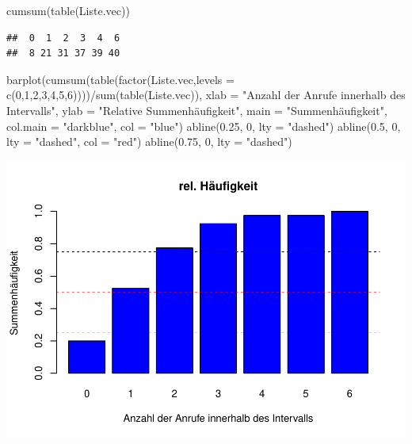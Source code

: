 \documentclass[
]{article}
\newenvironment{Shaded}{\begin{snugshade}}{\end{snugshade}}
\newcommand{\AttributeTok}[1]{\textcolor[rgb]{0.77,0.63,0.00}{#1}}
\newcommand{\DecValTok}[1]{\textcolor[rgb]{0.00,0.00,0.81}{#1}}
\newcommand{\FloatTok}[1]{\textcolor[rgb]{0.00,0.00,0.81}{#1}}
\newcommand{\FunctionTok}[1]{\textcolor[rgb]{0.00,0.00,0.00}{#1}}
\newcommand{\NormalTok}[1]{#1}
\newcommand{\SpecialCharTok}[1]{\textcolor[rgb]{0.00,0.00,0.00}{#1}}
\newcommand{\StringTok}[1]{\textcolor[rgb]{0.31,0.60,0.02}{#1}}
\begin{document}
\begin{Shaded}
\begin{Highlighting}[]
\FunctionTok{cumsum}\NormalTok{(}\FunctionTok{table}\NormalTok{(Liste.vec))}
\end{Highlighting}
\end{Shaded}

\begin{verbatim}
##  0  1  2  3  4  6 
##  8 21 31 37 39 40
\end{verbatim}

\begin{Shaded}
\begin{Highlighting}[]
\FunctionTok{barplot}\NormalTok{(}\FunctionTok{cumsum}\NormalTok{(}\FunctionTok{table}\NormalTok{(}\FunctionTok{factor}\NormalTok{(Liste.vec,}\AttributeTok{levels =} \FunctionTok{c}\NormalTok{(}\DecValTok{0}\NormalTok{,}\DecValTok{1}\NormalTok{,}\DecValTok{2}\NormalTok{,}\DecValTok{3}\NormalTok{,}\DecValTok{4}\NormalTok{,}\DecValTok{5}\NormalTok{,}\DecValTok{6}\NormalTok{))))}\SpecialCharTok{/}\FunctionTok{sum}\NormalTok{(}\FunctionTok{table}\NormalTok{(Liste.vec)), }\AttributeTok{xlab =} \StringTok{"Anzahl der Anrufe innerhalb des Intervalls"}\NormalTok{, }\AttributeTok{ylab =} \StringTok{"Relative Summenhäufigkeit"}\NormalTok{, }\AttributeTok{main =} \StringTok{"Summenhäufigkeit"}\NormalTok{, }\AttributeTok{col.main =} \StringTok{"darkblue"}\NormalTok{, }\AttributeTok{col =} \StringTok{"blue"}\NormalTok{)}
\FunctionTok{abline}\NormalTok{(}\FloatTok{0.25}\NormalTok{, }\DecValTok{0}\NormalTok{, }\AttributeTok{lty =} \StringTok{"dashed"}\NormalTok{)}
\FunctionTok{abline}\NormalTok{(}\FloatTok{0.5}\NormalTok{, }\DecValTok{0}\NormalTok{, }\AttributeTok{lty =} \StringTok{"dashed"}\NormalTok{, }\AttributeTok{col =} \StringTok{"red"}\NormalTok{)}
\FunctionTok{abline}\NormalTok{(}\FloatTok{0.75}\NormalTok{, }\DecValTok{0}\NormalTok{, }\AttributeTok{lty =} \StringTok{"dashed"}\NormalTok{)}
\end{Highlighting}
\end{Shaded}

\includegraphics{Uebung1_StefanDuenser_files/figure-latex/unnamed-chunk-7-1.pdf}
\end{document}
